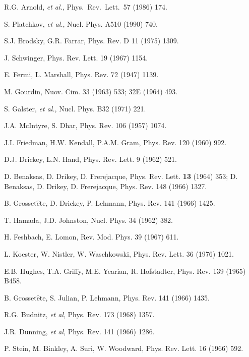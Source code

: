 \begin{thebibliography}{PPV06}
R.G. Arnold, {\it et al.},
Phys.\ Rev.\ Lett.\   57 (1986) 174.

S. Platchkov, {\it et al.}, Nucl. Phys.  A510 (1990) 740. 

S.J. Brodsky, G.R. Farrar, Phys. Rev. D  11 (1975) 1309.

J. Schwinger, Phys. Rev. Lett.  19 (1967) 1154. 

E. Fermi, L. Marshall, Phys. Rev.  72 (1947) 1139.

M. Gourdin, Nuov. Cim.  33 (1963) 533;  32E (1964) 493.

S. Galster, {\it et al.}, Nucl. Phys.  B32 (1971) 221.

J.A. McIntyre, S. Dhar, Phys. Rev.  106 (1957) 1074.

J.I. Friedman, H.W. Kendall, P.A.M. Gram, Phys. Rev. 120 (1960) 992.

D.J. Drickey, L.N. Hand, Phys. Rev. Lett.  9 (1962) 521.


D. Benaksas, D. Drikey, D. Frerejacque, Phys. Rev. Lett. {\bf 13} (1964) 353; D. Benaksas, D. Drikey, D. Frerejacque, Phys. Rev. 148 (1966) 1327.

B. Grosset$\hat{\mathrm e}$te, D. Drickey, P. Lehmann, Phys. Rev.  141 (1966) 1425.

T. Hamada, J.D. Johnston, Nucl. Phys. 34 (1962) 382.

H. Feshbach, E. Lomon, Rev. Mod. Phys. 39 (1967) 611.

 L. Koester, W. Nistler, W. Waschkowski, Phys.
Rev. Lett.  36 (1976) 1021.


E.B. Hughes, T.A. Griffy, M.E. Yearian, R. Hofstadter, 
Phys. Rev.  139 (1965) B458.

B. Grosset$\hat{\mathrm e}$te, S. Julian, P. Lehmann, 
Phys. Rev.  141 (1966) 1435.


R.G. Budnitz, {\it et al}, Phys. Rev. 173 (1968) 1357.

J.R. Dunning, {\it et al}, Phys. Rev.  141 (1966) 1286.

P. Stein, M. Binkley, A. Suri, W. Woodward, Phys. Rev. Lett.
 16 (1966) 592. 


\end{thebibliography}
